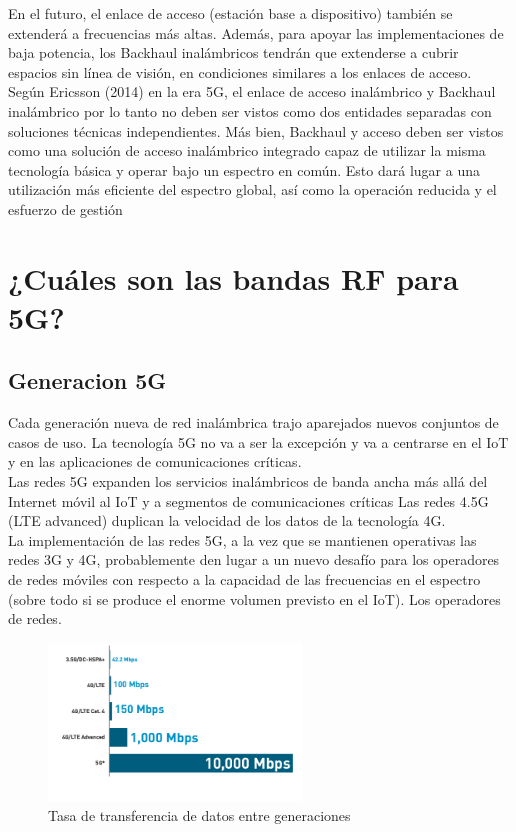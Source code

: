 \documentclass[]{article}
\begin{document}
En el futuro, el enlace de acceso (estación base a dispositivo) también se extenderá a
frecuencias más altas. Además, para apoyar las implementaciones de baja potencia, los
Backhaul inalámbricos tendrán que extenderse a cubrir espacios sin línea de visión, en
condiciones similares a los enlaces de acceso. Según Ericsson (2014) en la era 5G, el
enlace de acceso inalámbrico y Backhaul inalámbrico por lo tanto no deben ser vistos
como dos entidades separadas con soluciones técnicas independientes. Más bien,
Backhaul y acceso deben ser vistos como una solución de acceso inalámbrico integrado
capaz de utilizar la misma tecnología básica y operar bajo un espectro en común. Esto
dará lugar a una utilización más eficiente del espectro global, así como la operación
reducida y el esfuerzo de gestión

\section{ ¿Cuáles son las bandas RF para 5G?}






\subsection{Generacion 5G}


Cada generación nueva de red inalámbrica trajo aparejados nuevos conjuntos de casos de uso. La tecnología 5G no va a ser
la excepción y va a centrarse en el IoT y en las aplicaciones de comunicaciones críticas.\\

Las redes 5G expanden los servicios inalámbricos de banda ancha más allá del Internet móvil al IoT y a
segmentos de comunicaciones críticas Las redes 4.5G (LTE advanced) duplican la velocidad de los datos de la
tecnología 4G.\\


La implementación de las redes 5G, a la vez que se mantienen
operativas las redes 3G y 4G, probablemente den lugar a un nuevo
desafío para los operadores de redes móviles con respecto a la
capacidad de las frecuencias en el espectro (sobre todo si se
produce el enorme volumen previsto en el IoT). Los operadores de
redes.\\




\begin{figure}[h!]
	\centering
	\includegraphics[width=0.6\textwidth]{Imagenes/sist3.png}
	\caption{Tasa de transferencia de datos entre generaciones}
	\label{fig:sist3}
\end{figure}
\end{document}
